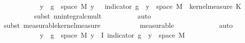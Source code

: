 \begin{isabellebody}
\isanewline
\ \ \ \ \ \ \isamarkupfalse%
\ \isamarkupfalse%
\ {\isachardoublequoteopen}{\isachardot}{\kern0pt}{\isachardot}{\kern0pt}{\isachardot}{\kern0pt}\ {\isacharequal}{\kern0pt}\ {\isacharparenleft}{\kern0pt}{\isasymSum}y\ {\isasymin}\ g\ {\isacharbackquote}{\kern0pt}\ space\ {\isacharquery}{\kern0pt}M{\isachardot}{\kern0pt}\ y\ {\isacharasterisk}{\kern0pt}\ {\isacharparenleft}{\kern0pt}{\isasymintegral}\isactrlsup {\isacharplus}{\kern0pt}{\isasymomega}\ {\isacharparenleft}{\kern0pt}indicator\ {\isacharparenleft}{\kern0pt}g\ {\isacharminus}{\kern0pt}{\isacharbackquote}{\kern0pt}\ {\isacharbraceleft}{\kern0pt}y{\isacharbraceright}{\kern0pt}\ {\isasyminter}\ space\ {\isacharquery}{\kern0pt}M{\isacharparenright}{\kern0pt}{\isacharparenleft}{\kern0pt}{\isasymomega}\ {\isasymomega}\ {\isasympartial}kernel{\isacharunderscore}{\kern0pt}measure\ K\ {\isasymomega}\isanewline
\ \ \ \ \ \ \ \ \isamarkupfalse%
\ {\isacharparenleft}{\kern0pt}subst\ nn{\isacharunderscore}{\kern0pt}integral{\isacharunderscore}{\kern0pt}cmult{\isacharparenright}{\kern0pt}\isanewline
\ \ \ \ \ \ \ \ \isamarkupfalse%
\ auto\isanewline
\ \ \ \ \ \ \ \ \isamarkupfalse%
\ {\isacharparenleft}{\kern0pt}subst\ measurable{\isacharunderscore}{\kern0pt}kernel{\isacharunderscore}{\kern0pt}measure{\isacharparenright}{\kern0pt}\isanewline
\ \ \ \ \ \ \ \ \ \isamarkupfalse%
\ measurable\isanewline
\ \ \ \ \ \ \ \ \isamarkupfalse%
\ {\isacharasterisk}{\kern0pt}\ \isamarkupfalse%
\ auto\isanewline
\ \ \ \ \ \ \isamarkupfalse%
\ \isamarkupfalse%
\ {\isachardoublequoteopen}{\isachardot}{\kern0pt}{\isachardot}{\kern0pt}{\isachardot}{\kern0pt}\ {\isacharequal}{\kern0pt}\ {\isacharparenleft}{\kern0pt}{\isasymSum}y\ {\isasymin}\ g\ {\isacharbackquote}{\kern0pt}\ space\ {\isacharquery}{\kern0pt}M{\isachardot}{\kern0pt}\ y\ {\isacharasterisk}{\kern0pt}\ I\ {\isacharparenleft}{\kern0pt}indicator\ {\isacharparenleft}{\kern0pt}g\ {\isacharminus}{\kern0pt}{\isacharbackquote}{\kern0pt}\ {\isacharbraceleft}{\kern0pt}y{\isacharbraceright}{\kern0pt}\ {\isasyminter}\ space\ {\isacharquery}{\kern0pt}M{\isacharparenright}{\kern0pt}{\isacharparenright}{\kern0pt}\ {\isasymomega}\isanewline

\end{isabellebody}
